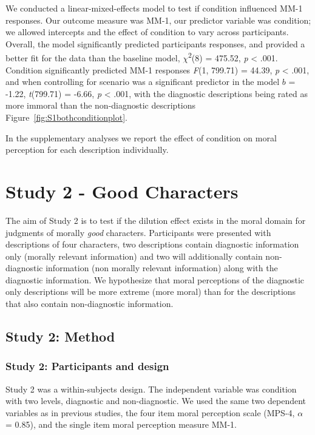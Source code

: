 \documentclass[
  man,floatsintext]{apa6}
\begin{document}
We conducted a linear-mixed-effects model to test if condition influenced MM-1 responses. Our outcome measure was MM-1, our predictor variable was condition; we allowed intercepts and the effect of condition to vary across participants. Overall, the model significantly predicted participants responses, and provided a better fit for the data than the baseline model, \(\chi\)\textsuperscript{2}(8) = 475.52, \emph{p} \textless{} .001. Condition significantly predicted MM-1 responses \emph{F}(1, 799.71) = 44.39, \emph{p} \textless{} .001, and when controlling for scenario was a significant predictor in the model \(b\) = -1.22, \emph{t}(799.71) = -6.66, \emph{p} \textless{} .001, with the diagnostic descriptions being rated as more immoral than the non-diagnostic descriptions Figure~\ref{fig:S1bothconditionplot}.

In the supplementary analyses we report the effect of condition on moral perception for each description individually.

\section{Study 2 - Good Characters}\label{study-2---good-characters}

The aim of Study 2 is to test if the dilution effect exists in the moral domain for judgments of morally \emph{good} characters. Participants were presented with descriptions of four characters, two descriptions contain diagnostic information only (morally relevant information) and two will additionally contain non-diagnostic information (non morally relevant information) along with the diagnostic information. We hypothesize that moral perceptions of the diagnostic only descriptions will be more extreme (more moral) than for the descriptions that also contain non-diagnostic information.

\subsection{Study 2: Method}\label{study-2-method}

\subsubsection{Study 2: Participants and design}\label{study-2-participants-and-design}

Study 2 was a within-subjects design. The independent variable was condition with two levels, diagnostic and non-diagnostic. We used the same two dependent variables as in previous studies, the four item moral perception scale (MPS-4, \(\alpha\) = 0.85), and the single item moral perception measure MM-1.
\end{document}
